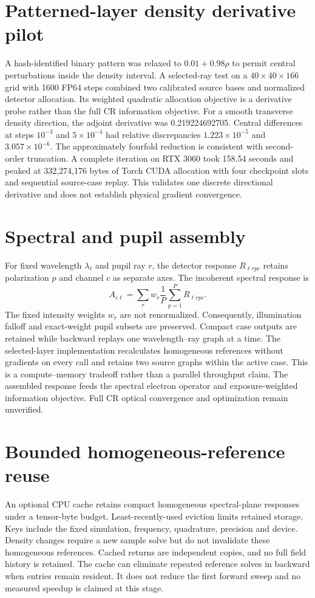 \documentclass[11pt,a4paper]{article}
\begin{document}
\section{Patterned-layer density derivative pilot}
A hash-identified binary pattern was relaxed to $0.01+0.98\rho$ to permit
central perturbations inside the density interval. A selected-ray test on a
$40\times40\times166$ grid with 1600 FP64 steps combined two calibrated source
bases and normalized detector allocation. Its weighted quadratic allocation
objective is a derivative probe rather than the full CR information objective.
For a smooth transverse density direction, the adjoint derivative was
0.219224692705. Central differences at steps $10^{-3}$ and $5\times10^{-4}$
had relative discrepancies $1.223\times10^{-5}$ and $3.057\times10^{-6}$.
The approximately fourfold reduction is consistent with second-order
truncation. A complete iteration on RTX 3060 took 158.54 seconds and peaked
at 332,274,176 bytes of Torch CUDA allocation with four checkpoint slots
and sequential source-case replay. This validates one discrete directional
derivative and does not establish physical gradient convergence.

\section{Spectral and pupil assembly}
For fixed wavelength $\lambda_\ell$ and pupil ray $r$, the detector response
$R_{\ell r p c}$ retains polarization $p$ and channel $c$ as separate axes.
The incoherent spectral response is
\[
 A_{c\ell}=\sum_r w_r\frac{1}{P}\sum_{p=1}^{P}R_{\ell r p c}.
\]
The fixed intensity weights $w_r$ are not renormalized. Consequently,
illumination falloff and exact-weight pupil subsets are preserved. Compact
case outputs are retained while backward replays one wavelength--ray graph
at a time. The selected-layer implementation recalculates homogeneous
references without gradients on every call and retains two source graphs
within the active case. This is a compute--memory tradeoff rather than a
parallel throughput claim. The assembled response feeds the spectral electron
operator and exposure-weighted information objective. Full CR optical
convergence and optimization remain unverified.

\section{Bounded homogeneous-reference reuse}
An optional CPU cache retains compact homogeneous spectral-plane responses
under a tensor-byte budget. Least-recently-used eviction limits retained
storage. Keys include the fixed simulation, frequency, quadrature, precision
and device. Density changes require a new sample solve but do not invalidate
these homogeneous references. Cached returns are independent copies, and no
full field history is retained. The cache can eliminate repeated reference
solves in backward when entries remain resident. It does not reduce the first
forward sweep and no measured speedup is claimed at this stage.
\end{document}
